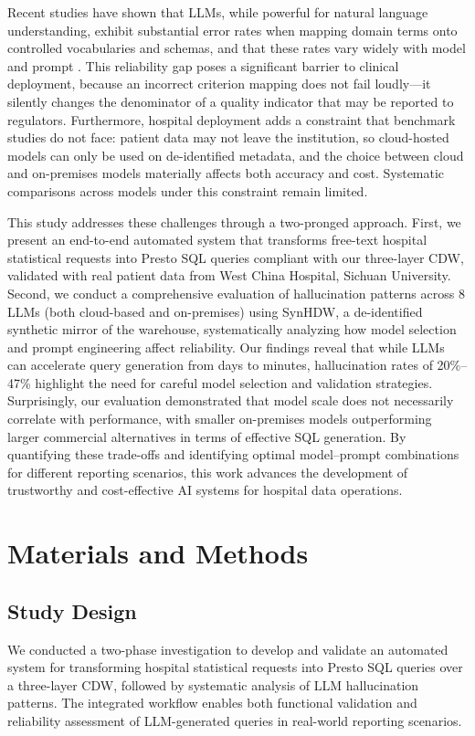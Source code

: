 \documentclass[applsci,article,submit,pdftex,oneauthor]{Definitions/mdpi}
\begin{document}
Recent studies have shown that LLMs, while powerful for natural language
understanding, exhibit substantial error rates when mapping domain terms onto
controlled vocabularies and schemas, and that these rates vary widely with model
and prompt \cite{halluc2024,ragstruct2024,chang2024}. This reliability gap poses a significant barrier to
clinical deployment, because an incorrect criterion mapping does not fail
loudly---it silently changes the denominator of a quality indicator that may be
reported to regulators. Furthermore, hospital deployment adds a constraint that
benchmark studies do not face: patient data may not leave the institution, so
cloud-hosted models can only be used on de-identified metadata, and the choice
between cloud and on-premises models materially affects both accuracy and cost.
Systematic comparisons across models under this constraint remain limited.

This study addresses these challenges through a two-pronged approach. First, we
present an end-to-end automated system that transforms free-text hospital
statistical requests into Presto SQL queries compliant with our three-layer CDW,
validated with real patient data from West China Hospital, Sichuan University. Second, we conduct a
comprehensive evaluation of hallucination patterns across 8 LLMs (both
cloud-based and on-premises) using SynHDW, a de-identified synthetic mirror of
the warehouse, systematically analyzing how model selection and prompt
engineering affect reliability. Our findings reveal that while LLMs can
accelerate query generation from days to minutes, hallucination rates of
20\%--47\% highlight the need for careful model selection and validation
strategies. Surprisingly, our evaluation demonstrated that model scale does not
necessarily correlate with performance, with smaller on-premises models
outperforming larger commercial alternatives in terms of effective SQL
generation. By quantifying these trade-offs and identifying optimal
model--prompt combinations for different reporting scenarios, this work advances
the development of trustworthy and cost-effective AI systems for hospital data
operations.

\section{Materials and Methods}

\subsection{Study Design}
We conducted a two-phase investigation to develop and validate an automated
system for transforming hospital statistical requests into Presto SQL queries
over a three-layer CDW, followed by systematic analysis of LLM hallucination
patterns. The integrated workflow enables both functional validation and
reliability assessment of LLM-generated queries in real-world reporting
scenarios.
\end{document}

